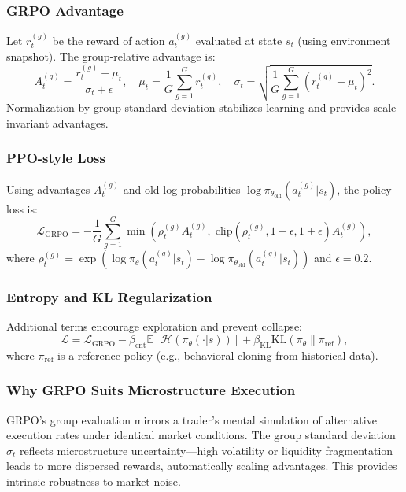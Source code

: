 \documentclass{article}
\begin{document}
\subsubsection{GRPO Advantage}
Let $r_t^{(g)}$ be the reward of action $a_t^{(g)}$ evaluated at state $s_t$ (using environment snapshot). The group-relative advantage is:
\begin{equation}
    A_t^{(g)} = \frac{r_t^{(g)} - \mu_t}{\sigma_t + \epsilon}, \quad \mu_t = \frac{1}{G} \sum_{g=1}^G r_t^{(g)}, \quad \sigma_t = \sqrt{\frac{1}{G} \sum_{g=1}^G (r_t^{(g)} - \mu_t)^2}.
\end{equation}
Normalization by group standard deviation stabilizes learning and provides scale-invariant advantages.

\subsubsection{PPO-style Loss}
Using advantages $A_t^{(g)}$ and old log probabilities $\log \pi_{\theta_{\text{old}}}(a_t^{(g)} | s_t)$, the policy loss is:
\begin{equation}
    \mathcal{L}_{\text{GRPO}} = -\frac{1}{G} \sum_{g=1}^G \min\left( \rho_t^{(g)} A_t^{(g)}, \;\text{clip}(\rho_t^{(g)}, 1-\epsilon, 1+\epsilon) A_t^{(g)} \right),
\end{equation}
where $\rho_t^{(g)} = \exp\left( \log \pi_\theta(a_t^{(g)} | s_t) - \log \pi_{\theta_{\text{old}}}(a_t^{(g)} | s_t) \right)$ and $\epsilon=0.2$.

\subsubsection{Entropy and KL Regularization}
Additional terms encourage exploration and prevent collapse:
\begin{equation}
    \mathcal{L} = \mathcal{L}_{\text{GRPO}} - \beta_{\text{ent}} \mathbb{E}[\mathcal{H}(\pi_\theta(\cdot|s))] + \beta_{\text{KL}} \text{KL}(\pi_\theta \| \pi_{\text{ref}}),
\end{equation}
where $\pi_{\text{ref}}$ is a reference policy (e.g., behavioral cloning from historical data).

\subsubsection{Why GRPO Suits Microstructure Execution}
GRPO's group evaluation mirrors a trader's mental simulation of alternative execution rates under identical market conditions. The group standard deviation $\sigma_t$ reflects microstructure uncertainty—high volatility or liquidity fragmentation leads to more dispersed rewards, automatically scaling advantages. This provides intrinsic robustness to market noise.
\end{document}

